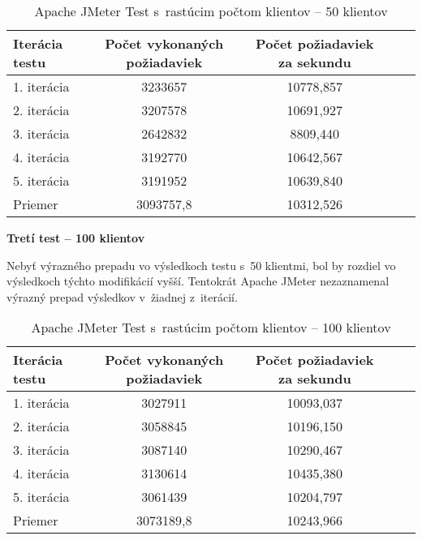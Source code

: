 \documentclass[12pt,oneside,final]{fithesis-utf8}
\begin{document}
\begin{itemize}
\begin{table}[H]
\begin{center}
\begin{tabular}{ | l | c | c | c | c |}
		\hline
		 \textbf{Iterácia testu} & \textbf{Počet vykonaných požiadaviek} & \textbf{Počet požiadaviek za sekundu} \\ \hline
		 1. iterácia & 3233657 & 10778,857 \\ \hline
		 2. iterácia & 3207578 & 10691,927 \\ \hline
		 3. iterácia & 2642832 & 8809,440 \\ \hline
		 4. iterácia & 3192770 & 10642,567 \\ \hline
		 5. iterácia & 3191952 & 10639,840 \\ \hline
		 Priemer & 3093757,8 & 10312,526 \\ \hline
		 
\end{tabular}
\end{center}
\caption{Apache JMeter Test s~rastúcim počtom klientov -- 50 klientov}
\end{table}


\textbf{Tretí test -- 100 klientov}

Nebyť výrazného prepadu vo výsledkoch testu s~50 klientmi, bol by rozdiel vo výsledkoch týchto modifikácií vyšší. Tentokrát Apache JMeter nezaznamenal výrazný prepad výsledkov v~žiadnej z~iterácií.

\begin{table}[H]
\begin{center}
\begin{tabular}{ | l | c | c | c | c |}
		\hline
		 \textbf{Iterácia testu} & \textbf{Počet vykonaných požiadaviek} & \textbf{Počet požiadaviek za sekundu} \\ \hline
		 1. iterácia & 3027911 & 10093,037 \\ \hline
		 2. iterácia & 3058845 & 10196,150 \\ \hline
		 3. iterácia & 3087140 & 10290,467 \\ \hline
		 4. iterácia & 3130614 & 10435,380 \\ \hline
		 5. iterácia & 3061439 & 10204,797 \\ \hline
		 Priemer & 3073189,8 & 10243,966 \\ \hline
		 
\end{tabular}
\end{center}
\caption{Apache JMeter Test s~rastúcim počtom klientov -- 100 klientov}
\end{table}



\end{itemize}
\end{document}
